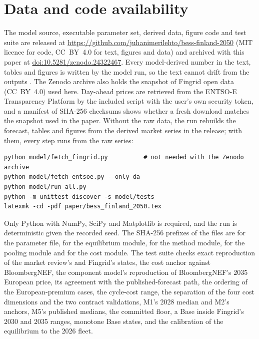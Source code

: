 \documentclass[11pt]{article}
\begin{document}
\section*{Data and code availability}
The model source, executable parameter set, derived data, figure code and test suite are released at \url{https://github.com/juhanimerilehto/bess-finland-2050} (MIT licence for code, CC~BY~4.0 for text, figures and data) and archived with this paper at \href{https://doi.org/10.5281/zenodo.24322467}{doi:10.5281/zenodo.24322467}.
Every model-derived number in the text, tables and figures is written by the model run, so the text cannot drift from the outputs \citep{pfenninger2017open}.
The Zenodo archive also holds the snapshot of Fingrid open data (CC~BY~4.0) used here. Day-ahead prices are retrieved from the ENTSO-E Transparency Platform by the included script with the user's own security token, and a manifest of SHA-256 checksums shows whether a fresh download matches the snapshot used in the paper.
Without the raw data, the run rebuilds the forecast, tables and figures from the derived market series in the release; with them, every step runs from the raw series:
\begin{verbatim}
python model/fetch_fingrid.py          # not needed with the Zenodo archive
python model/fetch_entsoe.py --only da
python model/run_all.py
python -m unittest discover -s model/tests
latexmk -cd -pdf paper/bess_finland_2050.tex
\end{verbatim}
Only Python with NumPy, SciPy and Matplotlib is required, and the run is deterministic given the recorded seed.
The SHA-256 prefixes of the files are \texttt{} for the parameter file, \texttt{} for the equilibrium module, \texttt{} for the method module, \texttt{} for the pooling module and \texttt{} for the cost module.
The test suite checks exact reproduction of the market review's and Fingrid's states, the cost anchor against BloombergNEF, the component model's reproduction of BloombergNEF's 2035 European price, its agreement with the published-forecast path, the ordering of the European-premium cases, the cycle-cost range, the separation of the four cost dimensions and the two contract validations, M1's 2028 median and M2's anchors, M5's published medians, the committed floor, a Base inside Fingrid's 2030 and 2035 ranges, monotone Base states, and the calibration of the equilibrium to the 2026 fleet.



\end{document}
